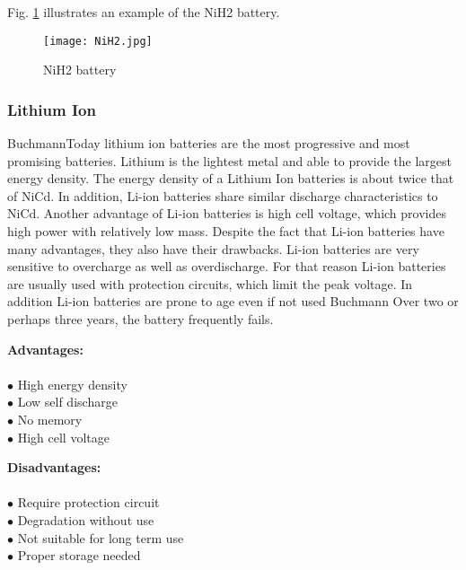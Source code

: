 Fig. \ref{fig: nih2} illustrates an example of the NiH2 battery. 


\begin{figure}[h]
	\centering
	\texttt{[image: NiH2.jpg]}
	\caption{ NiH2 battery \cite{10}}
	\label{fig: nih2}
\end{figure}

\subsubsection{Lithium Ion \label{sec:tech}}

Buchmann\cite{7}Today lithium ion batteries are the most progressive and most promising batteries. Lithium is the lightest metal and able to provide the largest energy density. The energy density of a Lithium Ion batteries is about twice that of NiCd. In addition, Li-ion batteries share similar discharge characteristics to NiCd. Another advantage of Li-ion batteries is high cell voltage, which provides high power with relatively low mass. Despite the fact that Li-ion batteries have many advantages, they also have their drawbacks. Li-ion batteries are very sensitive to overcharge as well as overdischarge. For that reason Li-ion batteries are usually used with protection circuits, which limit the peak voltage. In addition Li-ion batteries are prone to age even if not used Buchmann\cite{7} Over two or perhaps three years, the battery frequently fails.


\begin{multicols}{2}
	
	\textbf{Advantages:} \\ \\
	$\bullet$ High energy density\\
	$\bullet$ Low self discharge\\
	$\bullet$ No memory\\
	$\bullet$ High cell voltage\\
	
	
	
	
	\columnbreak
	
	\textbf{Disadvantages:} \\ \\
	$\bullet$ Require protection circuit\\
	$\bullet$ Degradation without use\\
	$\bullet$ Not suitable for long term use\\
	$\bullet$ Proper storage needed 

	
	
\end{multicols}

